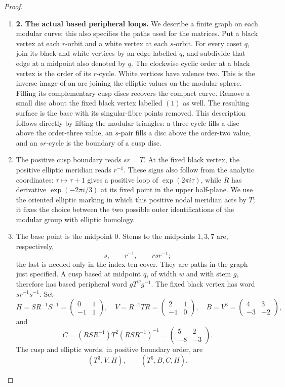 \begin{proof}
\begin{enumerate}[label=\arabic*.,leftmargin=*]
\item \par\medskip\noindent\textbf{2. The actual based peripheral loops.}\quad 
We describe a finite graph on each modular curve; this also specifies
the paths used for the matrices.  Put a black vertex at each
$r$-orbit and a white vertex at each $s$-orbit.  For every coset $q$,
join its black and white vertices by an edge labelled $q$, and
subdivide that edge at a midpoint also denoted by $q$.  The clockwise
cyclic order at a black vertex is the order of its $r$-cycle.  White
vertices have valence two.  This is the inverse image of an arc
joining the elliptic values on the modular sphere.  Filling its
complementary cusp discs recovers the compact curve.  Remove a
small disc about the fixed black vertex labelled $(1)$ as well.
The resulting surface is the base with its singular-fibre points
removed.  This description follows directly by lifting the modular
triangles: a three-cycle fills a disc above the order-three value,
an $s$-pair fills a disc above the order-two value, and an $sr$-cycle
is the boundary of a cusp disc.

\item The positive cusp boundary reads $sr=T$.  At the fixed black vertex,
the positive elliptic meridian reads $r^{-1}$.  These signs also
follow from the analytic coordinates: $\tau\mapsto\tau+1$ gives
a positive loop of $\exp(2\pi i\tau)$, while $R$ has derivative
$\exp(-2\pi i/3)$ at its fixed point in the upper half-plane.
We use the oriented elliptic marking in which this positive nodal
meridian acts by $T$; it fixes the choice between the two possible
outer identifications of the modular group with elliptic homology.

\item The base point is the midpoint $0$.  Stems to the midpoints $1,3,7$
are, respectively,
\[
 s,\qquad r^{-1},\qquad rsr^{-1};
\]
the last is needed only in the index-ten cover.  They are paths in
the graph just specified.  A cusp based at midpoint $q$, of width
$w$ and with stem $g$, therefore has based peripheral word
$gT^wg^{-1}$.  The fixed black vertex has word $sr^{-1}s^{-1}$.
Set
\begin{equation}\label{mapsD:repair:canonical-matrices}
 H=SR^{-1}S^{-1}=\begin{pmatrix}0&1\\-1&1\end{pmatrix},\quad
 V=R^{-1}TR=\begin{pmatrix}2&1\\-1&0\end{pmatrix},\quad
 B=V^3=\begin{pmatrix}4&3\\-3&-2\end{pmatrix},
\end{equation}
and
\[
 C=(RSR^{-1})T^2(RSR^{-1})^{-1}
   =\begin{pmatrix}5&2\\-8&-3\end{pmatrix}.
\]
The cusp and elliptic words, in positive boundary order, are
\[
 (T^3,V,H),\qquad (T^5,B,C,H).
\]


\end{enumerate}
\end{proof}
